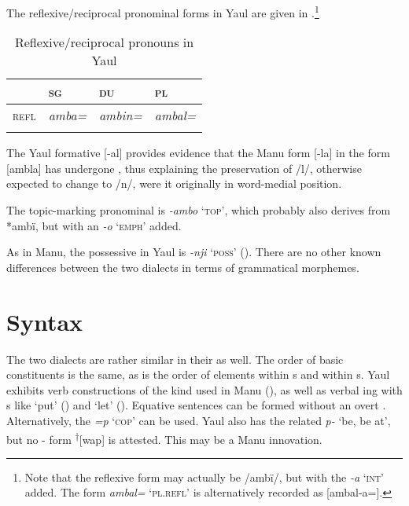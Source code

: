   The   reflexive/reciprocal pronominal forms in Yaul are given in .\footnote{Note that the  reflexive form may actually be /ambï/, but with the   \textit{-a} ‘\textsc{int}’ added. The form \textit{ambal=} ‘\textsc{pl.refl}’ is alternatively recorded as [ambal-a=].}

\begin{table}
\caption{Reflexive/reciprocal pronouns in Yaul}
\label{tab::18.21.b}
\begin{tabularx}{.7\textwidth}{lQQQ}
\lsptoprule
& {\scshape sg} & {\scshape du} & {\scshape pl}\\
\midrule
{\scshape refl} & {\itshape amba=} & {\itshape ambin=} & {\itshape ambal=}\\
\lspbottomrule
\end{tabularx}
\end{table}

The Yaul  formative [-al] provides evidence that the Manu  form [-la] in the   form [ambla] has undergone , thus explaining the preservation of /l/, otherwise expected to change to /n/, were it originally in word-medial position.

The  topic-marking pronominal  is \textit{-ambo} ‘\textsc{top}’, which probably also derives from *ambï, but with an   \textit{-o} ‘\textsc{emph}’ added.

As in Manu, the  possessive  in Yaul is \textit{-nji} ‘\textsc{poss}’ (). There are no other known differences between the two dialects in terms of grammatical morphemes.



\section{\label{sec:18.5}  Syntax}


The two dialects are rather similar in their  as well. The order of basic constituents is the same, as is the order of elements within s and within s. Yaul exhibits  verb constructions of the kind used in Manu (), as well as verbal ing with s like ‘put’ () and ‘let’ ().  Equative sentences can be formed without an overt . Alternatively, the  \textit{=p} ‘\textsc{cop}’ can be used. Yaul also has the related  \textit{p-} ‘be, be at’, but no - form \textsuperscript{†}[wap] is attested. This may be a Manu innovation.

